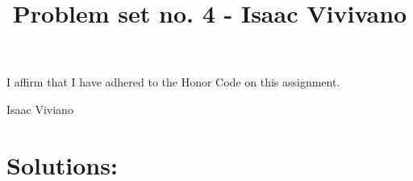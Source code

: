 \documentclass[12pt, reqno]{amsart}
\theoremstyle{definition}
\theoremstyle{remark}
\begin{document}
\title[Math 357 - Harmonic Analysis]{Problem set no. 4 - Isaac Vivivano}

\begin{titlepage}

\maketitle
I affirm that I have adhered to the Honor Code on this assignment.

Isaac  Viviano
   
\end{titlepage}

\section*{}


\section{Solutions:} 
\end{document}
